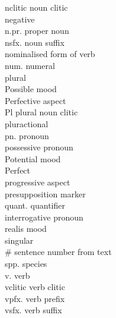 \begin{multicols}{2}
\begin{tabbing}
	nclitic \> noun clitic\\
	\NEG \> negative \\
	n.pr. \> proper noun\\
	nsfx. \> noun suffix\\
	\NOM \> nominalised form of verb\\
	num. \> numeral\\
	\plural \> plural\\
	\PBL \> Possible mood\\
	\PFV \> Perfective aspect\\
	Pl \> plural noun clitic\\
	\PLU \> pluractional\\
	pn. \> pronoun\\
	\POSS \> possessive pronoun\\
	\POT \> Potential mood\\
	\PRF \> Perfect\\
	\PRG \> progressive aspect\\
	\PSP \> presupposition marker\\
	quant. \> quantifier \\
	\QUEST \> interrogative pronoun\\
	\realis \> realis mood\\
	\singular \> singular\\
	\sennum \# \> sentence number from text\\
	spp. \> species\\
	v. \> verb\\
  	vclitic \> verb clitic\\
	vpfx. \> verb prefix\\
	vsfx. \> verb suffix\\
\end{tabbing}
 
\end{multicols} 
\setlength{\parindent}{10pt}